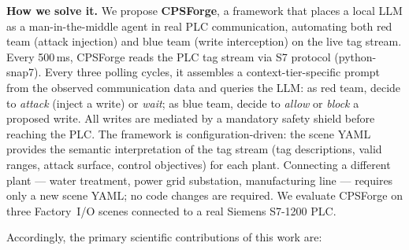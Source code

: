\textbf{How we solve it.} We propose \textbf{CPSForge}, a framework that places a local LLM as a man-in-the-middle agent in real PLC communication, automating both red team (attack injection) and blue team (write interception) on the live tag stream. Every 500\,ms, CPSForge reads the PLC tag stream via S7 protocol (python-snap7). Every three polling cycles, it assembles a context-tier-specific prompt from the observed communication data and queries the LLM: as red team, decide to \emph{attack} (inject a write) or \emph{wait}; as blue team, decide to \emph{allow} or \emph{block} a proposed write. All writes are mediated by a mandatory safety shield before reaching the PLC. The framework is configuration-driven: the scene YAML provides the semantic interpretation of the tag stream (tag descriptions, valid ranges, attack surface, control objectives) for each plant. Connecting a different plant --- water treatment, power grid substation, manufacturing line --- requires only a new scene YAML; no code changes are required. We evaluate CPSForge on three Factory~I/O scenes connected to a real Siemens S7-1200 PLC.

Accordingly, the primary scientific contributions of this work are:

